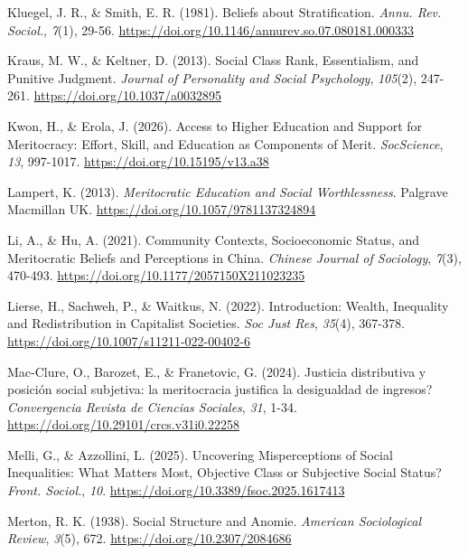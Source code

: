 \documentclass[
  spanish,
  a4paper,
  oneside]{scrbook}
\newlength{\cslhangindent}
\newenvironment{CSLReferences}[2] %
 {\begin{list}{}{%
  \setlength{\itemindent}{0pt}
  \setlength{\leftmargin}{0pt}
  \setlength{\parsep}{0pt}
  \ifodd #1
   \setlength{\leftmargin}{\cslhangindent}
   \setlength{\itemindent}{-1\cslhangindent}
  \fi
  \setlength{\itemsep}{#2\baselineskip}}}
 {\end{list}}
\begin{document}
\begin{CSLReferences}{1}{0}
Kluegel, J. R., \& Smith, E. R. (1981). Beliefs about {Stratification}.
\emph{Annu. Rev. Sociol.}, \emph{7}(1), 29-56.
\url{https://doi.org/10.1146/annurev.so.07.080181.000333}

Kraus, M. W., \& Keltner, D. (2013). Social Class Rank, Essentialism,
and Punitive Judgment. \emph{Journal of Personality and Social
Psychology}, \emph{105}(2), 247-261.
\url{https://doi.org/10.1037/a0032895}

Kwon, H., \& Erola, J. (2026). Access to {Higher Education} and
{Support} for {Meritocracy}: {Effort}, {Skill}, and {Education} as
{Components} of {Merit}. \emph{SocScience}, \emph{13}, 997-1017.
\url{https://doi.org/10.15195/v13.a38}

Lampert, K. (2013). \emph{Meritocratic {Education} and {Social
Worthlessness}}. Palgrave Macmillan UK.
\url{https://doi.org/10.1057/9781137324894}

Li, A., \& Hu, A. (2021). Community Contexts, Socioeconomic Status, and
Meritocratic Beliefs and Perceptions in {China}. \emph{Chinese Journal
of Sociology}, \emph{7}(3), 470-493.
\url{https://doi.org/10.1177/2057150X211023235}

Lierse, H., Sachweh, P., \& Waitkus, N. (2022). Introduction: {Wealth},
{Inequality} and {Redistribution} in {Capitalist Societies}. \emph{Soc
Just Res}, \emph{35}(4), 367-378.
\url{https://doi.org/10.1007/s11211-022-00402-6}

Mac-Clure, O., Barozet, E., \& Franetovic, G. (2024). {Justicia
distributiva y posición social subjetiva: \textquestiondown la
meritocracia justifica la desigualdad de ingresos?} \emph{Convergencia
Revista de Ciencias Sociales}, \emph{31}, 1-34.
\url{https://doi.org/10.29101/crcs.v31i0.22258}

Melli, G., \& Azzollini, L. (2025). Uncovering Misperceptions of Social
Inequalities: What Matters Most, Objective Class or Subjective Social
Status? \emph{Front. Sociol.}, \emph{10}.
\url{https://doi.org/10.3389/fsoc.2025.1617413}

Merton, R. K. (1938). Social {Structure} and {Anomie}. \emph{American
Sociological Review}, \emph{3}(5), 672.
\url{https://doi.org/10.2307/2084686}


\end{CSLReferences}
\end{document}
